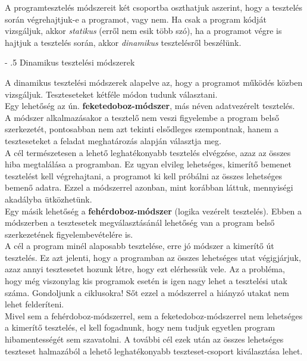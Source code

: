 \documentclass[12pt,margin=0px]{article}
\makeatletter
\renewcommand\paragraph{%
	\@startsection{paragraph}{4}{0mm}%
	{-\baselineskip}%
	{.5\baselineskip}%
	{\normalfont\normalsize\bfseries}}
\makeatother
\begin{document}
    \noindent A programtesztelés módszereit két csoportba oszthatjuk aszerint, hogy a tesztelés során végrehajtjuk-e a programot, vagy nem. Ha csak a program kódját vizsgáljuk, akkor \emph{statikus} (erről nem esik több szó), ha a programot végre is hajtjuk a tesztelés során, akkor \emph{dinamikus} tesztelésről beszélünk.
	
	\paragraph{Dinamikus tesztelési módszerek}

    A dinamikus tesztelési módszerek alapelve az, hogy a programot működés közben vizsgáljuk. Teszteseteket kétféle módon tudunk választani. \\

    \noindent Egy lehetőség az ún. \textbf{feketedoboz-módszer}, más néven adatvezérelt tesztelés.\\
    A módszer alkalmazásakor a tesztelő nem veszi figyelembe a program belső szerkezetét, pontosabban nem azt tekinti elsődleges szempontnak, hanem a teszteseteket a feladat meghatározás alapján választja meg.\\
	
    \noindent A cél természetesen a lehető leghatékonyabb tesztelés elvégzése, azaz az összes hiba megtalálása a programban. Ez ugyan elvileg lehetséges, kimerítő bemenet tesztelést kell végrehajtani, a programot ki kell próbálni az összes lehetséges bemenő adatra. Ezzel a módszerrel azonban, mint korábban láttuk, mennyiségi akadályba ütközhetünk.\\
	
    \noindent Egy másik lehetőség a \textbf{fehérdoboz-módszer} (logika vezérelt tesztelés). Ebben a módszerben a tesztesetek megválasztásánál lehetőség van a program belső szerkezetének figyelembevételére is.\\
	
    \noindent A cél a program minél alaposabb tesztelése, erre jó módszer a kimerítő út tesztelés. Ez azt jelenti, hogy a programban az összes lehetséges utat végigjárjuk, azaz annyi tesztesetet hozunk létre, hogy ezt elérhessük vele. Az a probléma, hogy még viszonylag kis programok esetén is igen nagy lehet a tesztelési utak száma. Gondoljunk a ciklusokra! Sőt ezzel a módszerrel a hiányzó utakat nem lehet felderíteni.\\
	
    \noindent Mivel sem a fehérdoboz-módszerrel, sem a feketedoboz-módszerrel nem lehetséges a kimerítő tesztelés, el kell fogadnunk, hogy nem tudjuk egyetlen program hibamentességét sem szavatolni. A további cél ezek után az összes lehetséges teszteset halmazából a lehető leghatékonyabb teszteset-csoport kiválasztása lehet.\\
	
\end{document}
